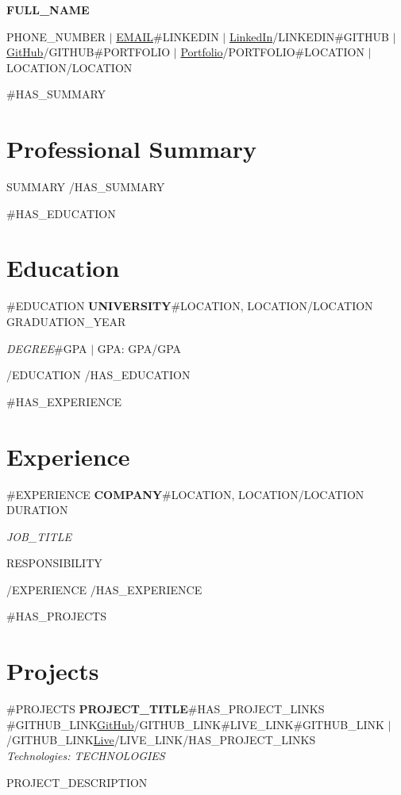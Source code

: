 \documentclass[10pt,letterpaper]{article}
\begin{document}
\begin{center}
{\Large \textbf{\uppercase{{{FULL_NAME}}}}}

\vspace{2pt}
{\small {{PHONE_NUMBER}} $|$ \href{mailto:{{EMAIL}}}{{{EMAIL}}}{{#LINKEDIN}} $|$ \href{{{LINKEDIN}}}{LinkedIn}{{/LINKEDIN}}{{#GITHUB}} $|$ \href{{{GITHUB}}}{GitHub}{{/GITHUB}}{{#PORTFOLIO}} $|$ \href{{{PORTFOLIO}}}{Portfolio}{{/PORTFOLIO}}{{#LOCATION}} $|$ {{LOCATION}}{{/LOCATION}}}
\end{center}

{{#HAS_SUMMARY}}
\section*{Professional Summary}
{{SUMMARY}}
{{/HAS_SUMMARY}}

{{#HAS_EDUCATION}}
\section*{Education}
{{#EDUCATION}}
\textbf{{{UNIVERSITY}}}{{#LOCATION}}, {{LOCATION}}{{/LOCATION}} \hfill {{GRADUATION_YEAR}}

\textit{{{DEGREE}}}{{#GPA}} $|$ GPA: {{GPA}}{{/GPA}}

{{/EDUCATION}}
{{/HAS_EDUCATION}}

{{#HAS_EXPERIENCE}}
\section*{Experience}
{{#EXPERIENCE}}
\textbf{{{COMPANY}}}{{#LOCATION}}, {{LOCATION}}{{/LOCATION}} \hfill {{DURATION}}

\textit{{{JOB_TITLE}}}
\begin{itemize}
{{RESPONSIBILITY}}
\end{itemize}

{{/EXPERIENCE}}
{{/HAS_EXPERIENCE}}

{{#HAS_PROJECTS}}
\section*{Projects}
{{#PROJECTS}}
\textbf{{{PROJECT_TITLE}}}{{#HAS_PROJECT_LINKS}} \hfill{{#GITHUB_LINK}}\href{{{GITHUB_LINK}}}{GitHub}{{/GITHUB_LINK}}{{#LIVE_LINK}}{{#GITHUB_LINK}} $|$ {{/GITHUB_LINK}}\href{{{LIVE_LINK}}}{Live}{{/LIVE_LINK}}{{/HAS_PROJECT_LINKS}}
\\{\small\textit{Technologies: {{{TECHNOLOGIES}}}}}
\begin{itemize}
{{PROJECT_DESCRIPTION}}
\end{itemize}
\end{document}
